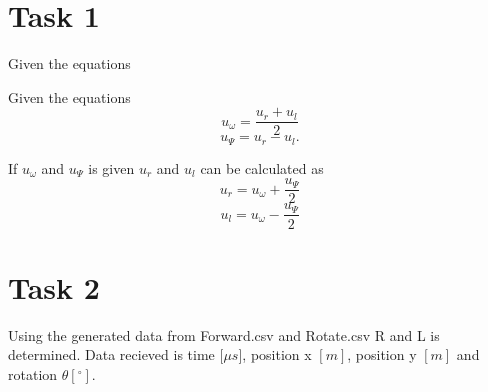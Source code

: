 \documentclass[a4paper,12pt,oneside,onecolumn]{article} %
\begin{document}
\section*{Task 1}

Given the equations 

Given the equations 
	\begin{equation}
		u_\omega = \frac{u_r + u_l}{2}
	\end{equation}
	\begin{equation}
		u_\Psi = u_r-u_l.
	\end{equation}
	
If $u_\omega$ and $u_\Psi$ is given $u_r$ and $u_l$ can be calculated as
	\begin{equation}
		u_r = u_\omega + \frac{u_\Psi}{2}
	\end{equation}
	\begin{equation}
		u_l =  u_\omega-\frac{u_\Psi}{2}
	\end{equation}
	
\section*{Task 2}

Using the generated data from Forward.csv and Rotate.csv R and L is determined. Data recieved is time $[\mu$$s]$, position x $[m]$, position y $[m]$ and rotation $\theta$$[^{\circ}]$. %
\end{document}
